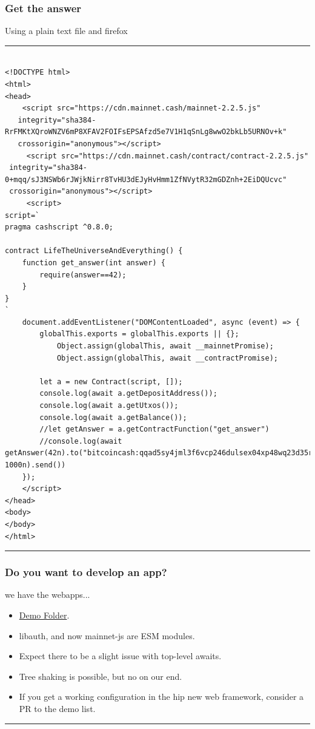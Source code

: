 \documentclass{beamer}
\begin{document}
\begin{frame}[fragile]
    \frametitle{Get the answer}
    Using a plain text file and firefox
    \rule{\textwidth}{0.4pt}
    {\fontsize{3pt}{3.6pt}\selectfont
    \begin{verbatim}
      
<!DOCTYPE html>
<html>
<head>
    <script src="https://cdn.mainnet.cash/mainnet-2.2.5.js"
   integrity="sha384-RrFMKtXQroWNZV6mP8XFAV2FOIFsEPSAfzd5e7V1H1qSnLg8wwO2bkLb5URNOv+k"
   crossorigin="anonymous"></script>
     <script src="https://cdn.mainnet.cash/contract/contract-2.2.5.js"
 integrity="sha384-0+mqq/sJ3NSWb6rJWjkNirr8TvHU3dEJyHvHmm1ZfNVytR32mGDZnh+2EiDQUcvc"
 crossorigin="anonymous"></script>
     <script>
script=`
pragma cashscript ^0.8.0;

contract LifeTheUniverseAndEverything() {
    function get_answer(int answer) {
        require(answer==42);
    }
}
`
    document.addEventListener("DOMContentLoaded", async (event) => {
        globalThis.exports = globalThis.exports || {};
            Object.assign(globalThis, await __mainnetPromise);
            Object.assign(globalThis, await __contractPromise);

        let a = new Contract(script, []);
        console.log(await a.getDepositAddress());
        console.log(await a.getUtxos());
        console.log(await a.getBalance());
        //let getAnswer = a.getContractFunction("get_answer")
        //console.log(await getAnswer(42n).to("bitcoincash:qqad5sy4jml3f6vcp246dulsex04xp48wq23d35rqe", 1000n).send())
    });
    </script>     
</head>
<body>
</body>
</html>
    \end{verbatim}
    }
\rule{\textwidth}{0.4pt}
\end{frame}


\begin{frame}[fragile]
    \frametitle{Do you want to develop an app?}
    we have the webapps...
    \begin{itemize}
      \item
        \href{https://github.com/mainnet-cash/mainnet-js/tree/master/demo/vue-nuxt}{Demo Folder}.
        \item
        libauth, and now mainnet-js are ESM modules.
        \item
        Expect there to be a slight issue with top-level awaits.
        \item
        Tree shaking is possible, but no on our end.
        \item
        If you get a working configuration in the hip new web framework, consider a PR to the demo list.
      \end{itemize}
        
\rule{\textwidth}{0.4pt}
\end{frame}
\end{document}
